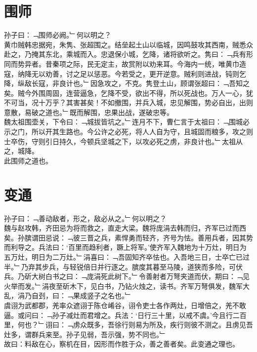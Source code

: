 \chapter{围师}%
孙子曰：﹁围师必阙。﹂何以明之？\\
黄巾贼韩忠据宛，朱隽、张超围之。结垒起土山以临城，因鸣鼓攻其西南，贼悉众赴之，乃掩其东北，乘城而入。忠退保小城，乞降，诸将欲听之。隽曰：﹁兵有形同而势异者。昔秦项之际，民无定主，故赏附以劝来耳。今海内一统，唯黄巾造寇，纳降无以劝善，讨之足以惩恶。今若受之，更开逆意。贼利则进战，钝则乞降，纵敌长寇，非良计也。﹂因急攻之，不克。隽登土山，顾谓张超曰：﹁吾知之矣。贼今外围周固，连营逼急，乞降不受，欲出不得，所以死战也。万人一心，犹不可当，况十万乎？其害甚矣！不如撤围，并兵入城，忠见解围，势必自出，出则意散，易破之道也。﹂既而解围，忠果出战，遂破忠等。\\
魏太祖围壶关，下令曰：﹁城拔皆坑之。﹂连月不下，曹仁言于太祖曰：﹁围城必示之门，所以开其生路也。今公许之必死，将人人自为守，且城固而粮多，攻之则士卒伤，守则引日持久，今顿兵坚城之下，以攻必死之虏，非良计也。﹂太祖从之，城降。
\\
此围师之道也。
%
%
\chapter{变通}%
孙子曰：﹁善动敌者，形之，敌必从之。﹂何以明之？\\
魏与赵攻韩，齐田忌为将而救之，直走大梁。魏将庞涓去韩而归，齐军已过而西矣。孙膑谓田忌说：﹁彼三晋之兵，素悍勇而轻齐，齐号为怯。善用兵者，因其势而利导之。兵法曰：‘百里而趋利者，蹶上将军。’使齐军入魏地为十万灶，明日为五万灶，明日为二万灶。﹂涓喜曰：﹁吾固知齐卒怯也。入吾地三日，士卒亡已过半。﹂乃弃其步兵，与轻锐倍日并行逐之。膑度其暮至马陵，道狭而多险，可伏兵。乃斫大树白书之曰：﹁庞涓死此树下。﹂令善射者万弩夹道而伏，期曰：﹁见火举而发。﹂涓夜至斫木下，见白书，乃钻火烛之，读书。齐军万弩俱发，魏军大乱，涓乃自刭，曰：﹁果成竖子之名也。﹂\\
虞诩为武都郡，羌率众遮诩于陈仓崤谷，诩令吏士各作两灶，日增倍之，羌不敢逼。或问曰：﹁孙子减灶而君增之。兵法：‘日行三十里，以戒不虞。’今且行二百里，何也？﹂诩曰：﹁虏众既多，吾徐行则易为所及，疾行则彼不测之。且虏见吾灶多，谓群兵来至。孙子见弱，吾示强，势不同也。﹂\\
故曰：料敌在心，察机在目，因形而作胜于众，善之善者矣。此变通之理也。
%
%
